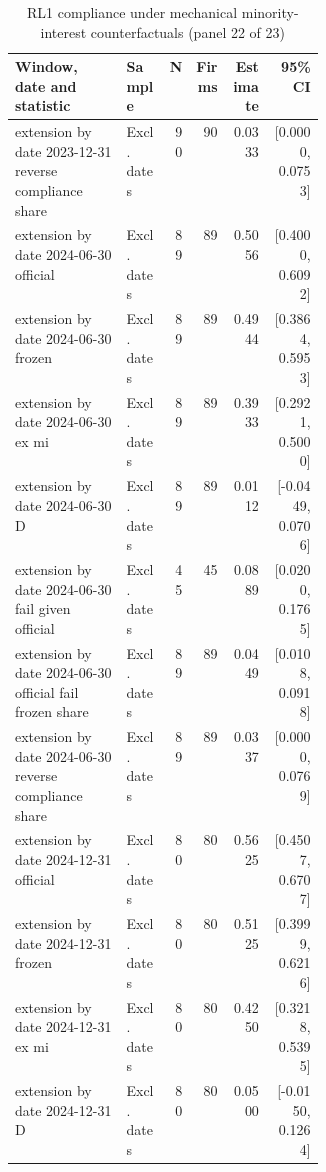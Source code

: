 \begin{table}[!htbp]\centering\scriptsize
\caption{RL1 compliance under mechanical minority-interest counterfactuals (panel 22 of 23)}
\begin{threeparttable}
\begin{tabular}{p{0.36\linewidth}lrrrr}
\toprule
Window, date and statistic & Sample & N & Firms & Estimate & 95\% CI \\
\midrule
extension by date 2023-12-31 reverse compliance share & Excl. dates & 90 & 90 & 0.0333 & [0.0000, 0.0753] \\
extension by date 2024-06-30 official & Excl. dates & 89 & 89 & 0.5056 & [0.4000, 0.6092] \\
extension by date 2024-06-30 frozen & Excl. dates & 89 & 89 & 0.4944 & [0.3864, 0.5953] \\
extension by date 2024-06-30 ex mi & Excl. dates & 89 & 89 & 0.3933 & [0.2921, 0.5000] \\
extension by date 2024-06-30 D & Excl. dates & 89 & 89 & 0.0112 & [-0.0449, 0.0706] \\
extension by date 2024-06-30 fail given official & Excl. dates & 45 & 45 & 0.0889 & [0.0200, 0.1765] \\
extension by date 2024-06-30 official fail frozen share & Excl. dates & 89 & 89 & 0.0449 & [0.0108, 0.0918] \\
extension by date 2024-06-30 reverse compliance share & Excl. dates & 89 & 89 & 0.0337 & [0.0000, 0.0769] \\
extension by date 2024-12-31 official & Excl. dates & 80 & 80 & 0.5625 & [0.4507, 0.6707] \\
extension by date 2024-12-31 frozen & Excl. dates & 80 & 80 & 0.5125 & [0.3999, 0.6216] \\
extension by date 2024-12-31 ex mi & Excl. dates & 80 & 80 & 0.4250 & [0.3218, 0.5395] \\
extension by date 2024-12-31 D & Excl. dates & 80 & 80 & 0.0500 & [-0.0150, 0.1264] \\
\bottomrule
\end{tabular}
\begin{tablenotes}[flushleft]\footnotesize

\end{tablenotes}
\end{threeparttable}
\end{table}
